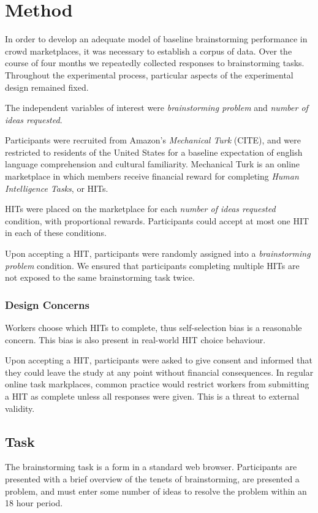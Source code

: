 \section{Method}

In order to develop an adequate model of baseline brainstorming performance in crowd marketplaces, it was necessary to establish a corpus of data. Over the course of four months we repeatedly collected responses to brainstorming tasks. Throughout the experimental process, particular aspects of the experimental design remained fixed.

The independent variables of interest were \emph{brainstorming problem} and \emph{number of ideas requested}.

Participants were recruited from Amazon's \emph{Mechanical Turk} (CITE), and were restricted to residents of the United States for a baseline expectation of english language comprehension and cultural familiarity. Mechanical Turk is an online marketplace in which members receive financial reward for completing \emph{Human Intelligence Tasks}, or HITs.

HITs were placed on the marketplace for each \emph{number of ideas requested} condition, with proportional rewards. Participants could accept at most one HIT in each of these conditions.

Upon accepting a HIT, participants were randomly assigned into a \emph{brainstorming problem} condition. We ensured that participants completing multiple HITs are not exposed to the same brainstorming task twice.

\subsubsection{Design Concerns}
Workers choose which HITs to complete, thus self-selection bias is a reasonable concern. This bias is also present in real-world HIT choice behaviour. 

Upon accepting a HIT, participants were asked to give consent and informed that they could leave the study at any point without financial consequences. In regular online task markplaces, common practice would restrict workers from submitting a HIT as complete unless all responses were given. This is a threat to external validity.

\subsection{Task}

The brainstorming task is a form in a standard web browser. Participants are presented with a brief overview of the tenets of brainstorming, are presented a problem, and must enter some number of ideas to resolve the problem within an 18 hour period.

